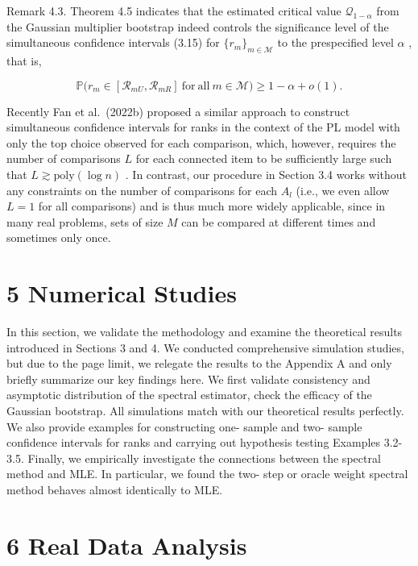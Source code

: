 Remark 4.3. Theorem 4.5 indicates that the estimated critical value
\(\mathcal{Q}_{1 - \alpha}\) from the Gaussian multiplier bootstrap
indeed controls the significance level of the simultaneous confidence
intervals (3.15) for \(\{r_m\}_{m\in \mathcal{M}}\) to the prespecified
level \(\alpha\) , that is,

\[
\mathbb{P}\Big(r_{m}\in [\mathcal{R}_{mU},\mathcal{R}_{mR}]\mathrm{~for~all~}m\in \mathcal{M}\Big)\geq 1 - \alpha +o(1).
\]

Recently Fan et al.~(2022b) proposed a similar approach to construct
simultaneous confidence intervals for ranks in the context of the PL
model with only the top choice observed for each comparison, which,
however, requires the number of comparisons \(L\) for each connected
item to be sufficiently large such that
\(L\gtrsim \mathrm{poly}(\log n)\) . In contrast, our procedure in
Section 3.4 works without any constraints on the number of comparisons
for each \(A_{l}\) (i.e., we even allow \(L = 1\) for all comparisons)
and is thus much more widely applicable, since in many real problems,
sets of size \(M\) can be compared at different times and sometimes only
once.

\section{5 Numerical Studies}\label{numerical-studies}

In this section, we validate the methodology and examine the theoretical
results introduced in Sections 3 and 4. We conducted comprehensive
simulation studies, but due to the page limit, we relegate the results
to the Appendix A and only briefly summarize our key findings here. We
first validate consistency and asymptotic distribution of the spectral
estimator, check the efficacy of the Gaussian bootstrap. All simulations
match with our theoretical results perfectly. We also provide examples
for constructing one- sample and two- sample confidence intervals for
ranks and carrying out hypothesis testing Examples 3.2- 3.5. Finally, we
empirically investigate the connections between the spectral method and
MLE. In particular, we found the two- step or oracle weight spectral
method behaves almost identically to MLE.

\section{6 Real Data Analysis}\label{real-data-analysis}

